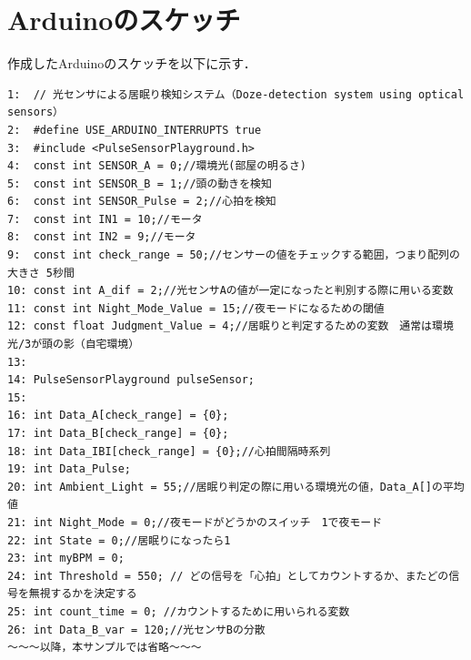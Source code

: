 \section{Arduinoのスケッチ}
作成したArduinoのスケッチを以下に示す．


\begin{lstlisting}
1:	// 光センサによる居眠り検知システム（Doze-detection system using optical sensors）
2:	#define USE_ARDUINO_INTERRUPTS true  
3:	#include <PulseSensorPlayground.h>  
4:	const int SENSOR_A = 0;//環境光(部屋の明るさ)
5:	const int SENSOR_B = 1;//頭の動きを検知
6:	const int SENSOR_Pulse = 2;//心拍を検知
7:	const int IN1 = 10;//モータ
8:	const int IN2 = 9;//モータ
9:	const int check_range = 50;//センサーの値をチェックする範囲，つまり配列の大きさ 5秒間
10:	const int A_dif = 2;//光センサAの値が一定になったと判別する際に用いる変数
11:	const int Night_Mode_Value = 15;//夜モードになるための閾値
12:	const float Judgment_Value = 4;//居眠りと判定するための変数　通常は環境光/3が頭の影（自宅環境）
13:	
14:	PulseSensorPlayground pulseSensor;
15:	
16:	int Data_A[check_range] = {0};
17:	int Data_B[check_range] = {0};
18:	int Data_IBI[check_range] = {0};//心拍間隔時系列
19:	int Data_Pulse;
20:	int Ambient_Light = 55;//居眠り判定の際に用いる環境光の値，Data_A[]の平均値
21:	int Night_Mode = 0;//夜モードがどうかのスイッチ　1で夜モード
22:	int State = 0;//居眠りになったら1
23:	int myBPM = 0;
24:	int Threshold = 550; // どの信号を「心拍」としてカウントするか、またどの信号を無視するかを決定する
25:	int count_time = 0; //カウントするために用いられる変数
26:	int Data_B_var = 120;//光センサBの分散
〜〜〜以降，本サンプルでは省略〜〜〜
\end{lstlisting}
